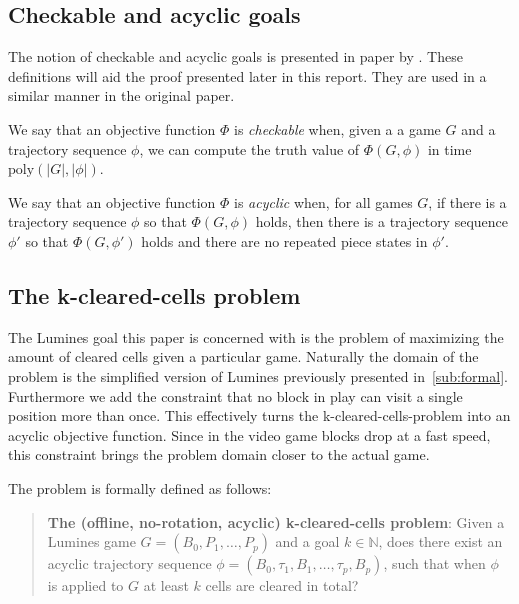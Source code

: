 \subsection{Checkable and acyclic goals}
The notion of checkable and acyclic goals is presented in paper by \citeauthor{tetris}. These definitions will aid the proof presented later in this report. They are used in a similar manner in the original paper.\\

\begin{defn}
\label{defn:checkable}
We say that an objective function $\Phi$ is \textit{checkable} when, given a a game $G$ and a trajectory sequence $\phi$, we can compute the truth value of $\Phi(G, \phi)$ in time $\text{poly}(|G|, |\phi|)$.
\end{defn}

\bigbreak

\begin{defn}
We say that an objective function $\Phi$ is \textit{acyclic} when, for all games $G$, if there is a trajectory sequence $\phi$ so that $\Phi(G, \phi)$ holds, then there is a trajectory sequence $\phi'$ so that $\Phi(G, \phi')$ holds and there are no repeated piece states in $\phi'$.
\end{defn}

\subsection{The k-cleared-cells problem}
The Lumines goal this paper is concerned with is the problem of maximizing the amount of cleared cells given a particular game. Naturally the domain of the problem is the simplified version of Lumines previously presented in~\ref{sub:formal}. Furthermore we add the constraint that no block in play can visit a single position more than once. This effectively turns the k-cleared-cells-problem into an acyclic objective function. Since in the video game blocks drop at a fast speed, this constraint brings the problem domain closer to the actual game.

The problem is formally defined as follows:

\begin{quote}
\textbf{The (offline, no-rotation, acyclic) k-cleared-cells problem}: Given a Lumines game $G=(B_0, P_1, \ldots, P_p)$ and a goal $k \in \mathbb{N}$, does there exist an acyclic trajectory sequence $\phi=(B_0, \tau_1, B_1, \ldots ,\tau_p, B_p)$, such that when $\phi$ is applied to $G$ at least $k$ cells are cleared in total?
\end{quote}
